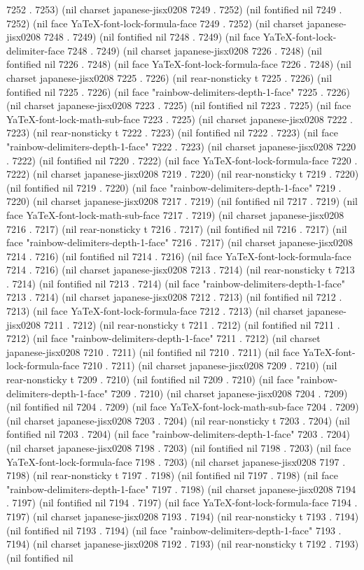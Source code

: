 7252 . 7253) (nil charset japanese-jisx0208 7249 . 7252) (nil fontified nil 7249 . 7252) (nil face YaTeX-font-lock-formula-face 7249 . 7252) (nil charset japanese-jisx0208 7248 . 7249) (nil fontified nil 7248 . 7249) (nil face YaTeX-font-lock-delimiter-face 7248 . 7249) (nil charset japanese-jisx0208 7226 . 7248) (nil fontified nil 7226 . 7248) (nil face YaTeX-font-lock-formula-face 7226 . 7248) (nil charset japanese-jisx0208 7225 . 7226) (nil rear-nonsticky t 7225 . 7226) (nil fontified nil 7225 . 7226) (nil face "rainbow-delimiters-depth-1-face" 7225 . 7226) (nil charset japanese-jisx0208 7223 . 7225) (nil fontified nil 7223 . 7225) (nil face YaTeX-font-lock-math-sub-face 7223 . 7225) (nil charset japanese-jisx0208 7222 . 7223) (nil rear-nonsticky t 7222 . 7223) (nil fontified nil 7222 . 7223) (nil face "rainbow-delimiters-depth-1-face" 7222 . 7223) (nil charset japanese-jisx0208 7220 . 7222) (nil fontified nil 7220 . 7222) (nil face YaTeX-font-lock-formula-face 7220 . 7222) (nil charset japanese-jisx0208 7219 . 7220) (nil rear-nonsticky t 7219 . 7220) (nil fontified nil 7219 . 7220) (nil face "rainbow-delimiters-depth-1-face" 7219 . 7220) (nil charset japanese-jisx0208 7217 . 7219) (nil fontified nil 7217 . 7219) (nil face YaTeX-font-lock-math-sub-face 7217 . 7219) (nil charset japanese-jisx0208 7216 . 7217) (nil rear-nonsticky t 7216 . 7217) (nil fontified nil 7216 . 7217) (nil face "rainbow-delimiters-depth-1-face" 7216 . 7217) (nil charset japanese-jisx0208 7214 . 7216) (nil fontified nil 7214 . 7216) (nil face YaTeX-font-lock-formula-face 7214 . 7216) (nil charset japanese-jisx0208 7213 . 7214) (nil rear-nonsticky t 7213 . 7214) (nil fontified nil 7213 . 7214) (nil face "rainbow-delimiters-depth-1-face" 7213 . 7214) (nil charset japanese-jisx0208 7212 . 7213) (nil fontified nil 7212 . 7213) (nil face YaTeX-font-lock-formula-face 7212 . 7213) (nil charset japanese-jisx0208 7211 . 7212) (nil rear-nonsticky t 7211 . 7212) (nil fontified nil 7211 . 7212) (nil face "rainbow-delimiters-depth-1-face" 7211 . 7212) (nil charset japanese-jisx0208 7210 . 7211) (nil fontified nil 7210 . 7211) (nil face YaTeX-font-lock-formula-face 7210 . 7211) (nil charset japanese-jisx0208 7209 . 7210) (nil rear-nonsticky t 7209 . 7210) (nil fontified nil 7209 . 7210) (nil face "rainbow-delimiters-depth-1-face" 7209 . 7210) (nil charset japanese-jisx0208 7204 . 7209) (nil fontified nil 7204 . 7209) (nil face YaTeX-font-lock-math-sub-face 7204 . 7209) (nil charset japanese-jisx0208 7203 . 7204) (nil rear-nonsticky t 7203 . 7204) (nil fontified nil 7203 . 7204) (nil face "rainbow-delimiters-depth-1-face" 7203 . 7204) (nil charset japanese-jisx0208 7198 . 7203) (nil fontified nil 7198 . 7203) (nil face YaTeX-font-lock-formula-face 7198 . 7203) (nil charset japanese-jisx0208 7197 . 7198) (nil rear-nonsticky t 7197 . 7198) (nil fontified nil 7197 . 7198) (nil face "rainbow-delimiters-depth-1-face" 7197 . 7198) (nil charset japanese-jisx0208 7194 . 7197) (nil fontified nil 7194 . 7197) (nil face YaTeX-font-lock-formula-face 7194 . 7197) (nil charset japanese-jisx0208 7193 . 7194) (nil rear-nonsticky t 7193 . 7194) (nil fontified nil 7193 . 7194) (nil face "rainbow-delimiters-depth-1-face" 7193 . 7194) (nil charset japanese-jisx0208 7192 . 7193) (nil rear-nonsticky t 7192 . 7193) (nil fontified nil 